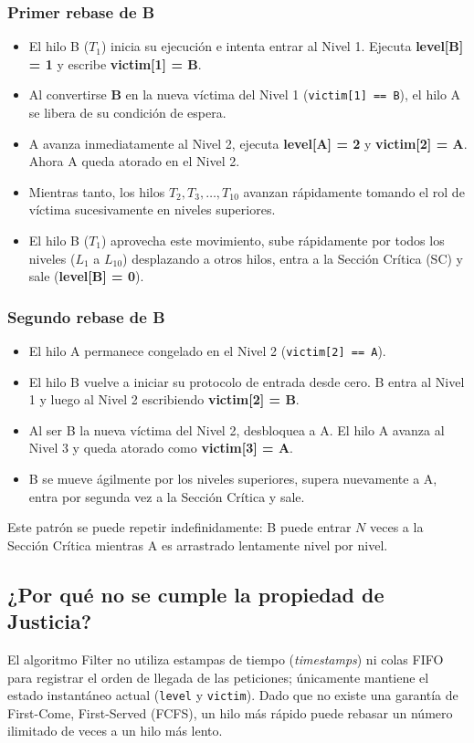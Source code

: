 \subsubsection*{Primer rebase de B}
\begin{itemize}
    \item El hilo B ($T_1$) inicia su ejecución e intenta entrar al Nivel 1. Ejecuta \textbf{level[B] = 1} y escribe \textbf{victim[1] = B}.
    \item Al convertirse \textbf{B} en la nueva víctima del Nivel 1 (\texttt{victim[1] == B}), el hilo A se libera de su condición de espera.
    \item A avanza inmediatamente al Nivel 2, ejecuta \textbf{level[A] = 2} y \textbf{victim[2] = A}. Ahora A queda atorado en el Nivel 2.
    \item Mientras tanto, los hilos $T_2, T_3, \dots, T_{10}$ avanzan rápidamente tomando el rol de víctima sucesivamente en niveles superiores.
    \item El hilo B ($T_1$) aprovecha este movimiento, sube rápidamente por todos los niveles ($L_1$ a $L_{10}$) desplazando a otros hilos, entra a la Sección Crítica (SC) y sale (\textbf{level[B] = 0}).
\end{itemize}

\subsubsection*{Segundo rebase de B}
\begin{itemize}
    \item El hilo A permanece congelado en el Nivel 2 (\texttt{victim[2] == A}).
    \item El hilo B vuelve a iniciar su protocolo de entrada desde cero. B entra al Nivel 1 y luego al Nivel 2 escribiendo \textbf{victim[2] = B}.
    \item Al ser B la nueva víctima del Nivel 2, desbloquea a A. El hilo A avanza al Nivel 3 y queda atorado como \textbf{victim[3] = A}.
    \item B se mueve ágilmente por los niveles superiores, supera nuevamente a A, entra por segunda vez a la Sección Crítica y sale.
\end{itemize}

Este patrón se puede repetir indefinidamente: B puede entrar $N$ veces a la Sección Crítica mientras A es arrastrado lentamente nivel por nivel.

\subsection*{¿Por qué no se cumple la propiedad de Justicia?}
El algoritmo Filter no utiliza estampas de tiempo (\textit{timestamps}) ni colas FIFO para registrar el orden de llegada de las peticiones; únicamente mantiene el estado instantáneo actual (\texttt{level} y \texttt{victim}). Dado que no existe una garantía de First-Come, First-Served (FCFS), un hilo más rápido puede rebasar un número ilimitado de veces a un hilo más lento.\\